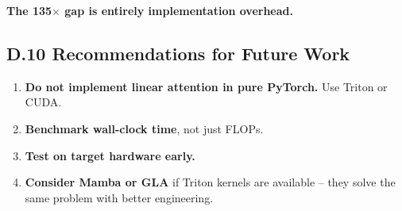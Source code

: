 \textbf{The 135$\times$ gap is entirely implementation overhead.}

\subsection{D.10 Recommendations for Future Work}

\begin{enumerate}
\item \textbf{Do not implement linear attention in pure PyTorch.} Use Triton or CUDA.
\item \textbf{Benchmark wall-clock time}, not just FLOPs.
\item \textbf{Test on target hardware early.}
\item \textbf{Consider Mamba or GLA} if Triton kernels are available -- they
  solve the same problem with better engineering.

\end{enumerate}

